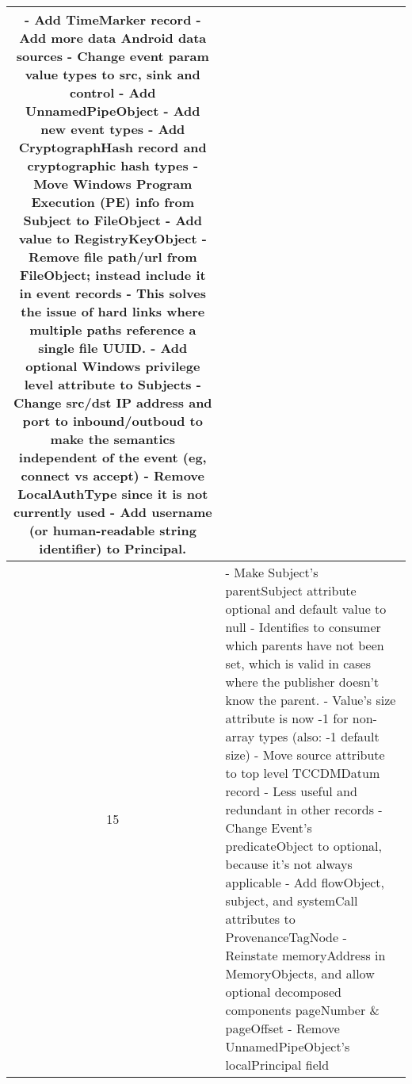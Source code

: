 \documentclass[10pt, conference, onecolumn]{IEEEtran}
\newcommand\tab[1][1em]{\hspace*{#1}}
\begin{document}
\begin{longtable}{|c|p{17cm}|}
  - Add TimeMarker record \newline
  - Add more data Android data sources \newline
  - Change event param value types to src, sink and control \newline
  - Add UnnamedPipeObject \newline
  - Add new event types \newline
  - Add CryptographHash record and cryptographic hash types \newline
  - Move Windows Program Execution (PE) info from Subject to FileObject \newline
  - Add value to RegistryKeyObject \newline
  - Remove file path/url from FileObject; instead include it in event records \newline
  \tab - This solves the issue of hard links where multiple paths reference a single file UUID. \newline
  - Add optional Windows privilege level attribute to Subjects \newline
  - Change src/dst IP address and port to inbound/outboud to make the semantics independent of the event (eg, connect vs accept) \newline
  - Remove LocalAuthType since it is not currently used \newline
  - Add username (or human-readable string identifier) to Principal.
\\\hline
15 & \small
  - Make Subject's parentSubject attribute optional and default value to null \newline
  \tab - Identifies to consumer which parents have not been set, which is valid in cases where the publisher doesn't know the parent. \newline
  - Value's size attribute is now -1 for non-array types (also: -1 default size) \newline
  - Move source attribute to top level TCCDMDatum record \newline
  \tab - Less useful and redundant in other records \newline
  - Change Event's predicateObject to optional, because it's not always applicable \newline
  - Add flowObject, subject, and systemCall attributes to ProvenanceTagNode \newline
  - Reinstate memoryAddress in MemoryObjects, and allow optional decomposed components pageNumber \& pageOffset \newline
  - Remove UnnamedPipeObject's localPrincipal field \newline

\end{longtable}
\end{document}
